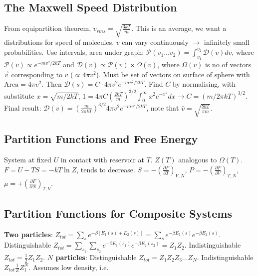 \documentclass[11pt,twocolumn]{amsart}
\begin{document}
\subsection{The Maxwell Speed Distribution}
From equipartition theorem, $v_{rms} = \sqrt{\frac{3kT}{m}}$. This is an average, we want a distributions for speed of molecules. $v$ can vary continuously $\rightarrow$ infinitely small probabilities. Use intervals, area under graph: $\mathcal{P}(v_1\dots v_2)=\int_{v_1}^{v_2}\mathcal{D}(v)dv$, where $\mathcal{P}(v) \propto e^{-mv^2/2kT}$ and $\mathcal{D}(v) \propto \mathcal{P}(v) \times \Omega(v)$, where $\Omega (v)$ is no of vectors $\vec{v}$ corresponding to $v$ ($\propto 4\pi v^2$). Must be set of vectors on surface of sphere with $\text{Area} = 4\pi v^2$. Then $\mathcal{D}(s) = C \cdot 4\pi v^2 e^{-mv^2/2kT}$. Find $C$ by normalising, with substitute $x=\sqrt{m/2kT}$, $1 = 4\pi C \left(\frac{2kT}{m} \right)^{3/2} \int_0^\infty x^2e^{-x^2}dx \rightarrow C = (m/2\pi kT)^{3/2}$. Final result: $\mathcal{D}(v) = \left( \frac{m}{2\pi kT}\right)^{3/2} 4\pi v^2 e^{-mv^2/2kT}$, note that $\bar{v}=\sqrt{\frac{8kT}{\pi m}}$.

\subsection{Partition Functions and Free Energy}
System at fixed $U$ in contact with reservoir at $T$. $Z(T)$ analogous to $\Omega(T)$. $F=U-TS=-kT\ln Z$, tends to decrease. $S=-\left(\frac{\partial F}{\partial T}\right)_{V,N}$, $P=-\left(\frac{\partial F}{\partial V}\right)_{T,N}$, $\mu=+\left(\frac{\partial F}{\partial N}\right)_{T,V}$.

\subsection{Partition Functions for Composite Systems}
\textbf{Two particles}: $ Z_{tot} = \sum_s e^{-\beta[E_1(s) + E_2(s)]} = \sum_s e^{-\beta E_1(s)} e^{-\beta E_2(s)}$. Distinguishable $ Z_{tot} = \sum_{s_1} \sum_{s_2} e^{-\beta E_1(s_1)} e^{-\beta E_2(s_2)} = Z_1 Z_2$. Indistinguishable  $Z_{tot} = \frac{1}{2} Z_1 Z_2$. \textbf{$N$ particles}: Distinguishable $ Z_{tot} = Z_1 Z_2 Z_3 \dots Z_N $. Indistinguishable $ Z_{tot} \frac{1}{Z}Z_1^N $. Assumes low density, i.e. 
\end{document}
